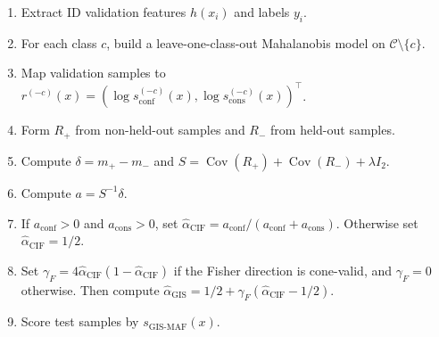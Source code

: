 \begin{enumerate}
    \item Extract ID validation features $h(x_i)$ and labels $y_i$.
    \item For each class $c$, build a leave-one-class-out Mahalanobis model on
          $\mathcal{C}\setminus\{c\}$.
    \item Map validation samples to
          $r^{(-c)}(x)=(\log s_{\mathrm{conf}}^{(-c)}(x),
          \log s_{\mathrm{cons}}^{(-c)}(x))^{\top}$.
    \item Form $R_{+}$ from non-held-out samples and $R_{-}$ from held-out
          samples.
    \item Compute $\delta=m_{+}-m_{-}$ and
          $S=\operatorname{Cov}(R_{+})+\operatorname{Cov}(R_{-})+\lambda I_2$.
    \item Compute $a=S^{-1}\delta$.
    \item If $a_{\mathrm{conf}}>0$ and $a_{\mathrm{cons}}>0$, set
          $\hat{\alpha}_{\mathrm{CIF}}=
          a_{\mathrm{conf}}/(a_{\mathrm{conf}}+a_{\mathrm{cons}})$.
          Otherwise set $\hat{\alpha}_{\mathrm{CIF}}=1/2$.
    \item Set
          $\gamma_F=4\hat{\alpha}_{\mathrm{CIF}}(1-\hat{\alpha}_{\mathrm{CIF}})$
          if the Fisher direction is cone-valid, and $\gamma_F=0$ otherwise.
          Then compute
          $\hat{\alpha}_{\mathrm{GIS}}
          =1/2+\gamma_F(\hat{\alpha}_{\mathrm{CIF}}-1/2)$.
    \item Score test samples by
          $s_{\mathrm{GIS\text{-}MAF}}(x)$.
\end{enumerate}
